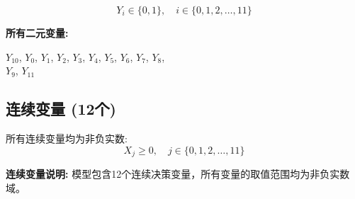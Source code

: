 \documentclass[a4paper,10pt]{article}
\begin{document}
\begin{equation}
Y_i \in \{0,1\}, \quad i \in \{0, 1, 2, \ldots, 11\}
\end{equation}

\textbf{所有二元变量:}

{\small
$Y_{10}$, $Y_{0}$, $Y_{1}$, $Y_{2}$, $Y_{3}$, $Y_{4}$, $Y_{5}$, $Y_{6}$, $Y_{7}$, $Y_{8}$, \\
$Y_{9}$, $Y_{11}$
}

\subsection{连续变量 (12个)}

所有连续变量均为非负实数:
\begin{equation}
X_j \geq 0, \quad j \in \{0, 1, 2, \ldots, 11\}
\end{equation}

\textbf{连续变量说明:} 模型包含12个连续决策变量，所有变量的取值范围均为非负实数域。
\end{document}
